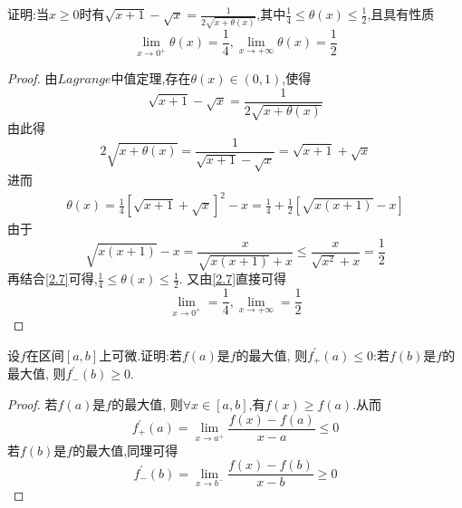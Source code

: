 \documentclass[lang=cn,newtx,10pt,scheme=chinese]{../Template/elegantbook}
\begin{document}
\begin{exercise}
证明:当\(x\geq0\)时有\(\sqrt{x+1}-\sqrt{x}=\frac{1}{2\sqrt{x+\theta(x)}}\),其中\(\frac{1}{4}\leq\theta(x)\leq\frac{1}{2}\),且具有性质
\begin{equation}
\lim\limits_{x\to0^{+}}\theta(x)=\frac{1}{4},\lim\limits_{x\to+\infty}\theta(x)=\frac{1}{2}
    \nonumber
\end{equation}

    \begin{proof}
    由$Lagrange$中值定理,存在$\theta(x)\in(0,1)$,使得
    \begin{equation}
    \sqrt{x+1}-\sqrt{x}=\frac{1}{2\sqrt{x+\theta(x)}}
        \nonumber
    \end{equation}
    由此得
    \begin{equation}
    2\sqrt{x+\theta(x)}=\frac{1}{\sqrt{x+1}-\sqrt{x}}=\sqrt{x+1}+\sqrt{x}
        \nonumber
    \end{equation}
    进而
    \begin{equation}\label{2.7}
    \begin{split}
    \theta(x)=\frac{1}{4}[\sqrt{x+1}+\sqrt{x}]^2-x
    =\frac{1}{4}+\frac{1}{2}[\sqrt{x(x+1)}-x]
    \end{split}
    \end{equation}
    由于
    \begin{equation}
    \sqrt{x(x+1)}-x=\frac{x}{\sqrt{x(x+1)}+x}\le \frac{x}{\sqrt{x^2}+x}=\frac{1}{2}
    \nonumber
    \end{equation}
    再结合\eqref{2.7}可得,$\frac{1}{4}\le\theta(x)\le\frac{1}{2}$.
    又由\eqref{2.7}直接可得
    \begin{equation}
    \lim_{x \to 0^{+}} =\frac{1}{4},\lim_{x \to +\infty}=\frac{1}{2}
        \nonumber
    \end{equation}
    \end{proof}
\end{exercise}

\begin{exercise}
    设\(f\)在区间\([a,b]\)上可微.证明:若\(f(a)\)是\(f\)的最大值,
    则\(f^{\prime}_{+}(a)\leq0\):若\(f(b)\)是\(f\)的最大值,
    则\(f^{\prime}_{-}(b)\geq0\).
    \begin{proof}
        若\(f(a)\)是\(f\)的最大值,
        则$\forall x\in[a,b]$,有$f(x) \ge f(a)$.从而
        \begin{equation}
            f_{+}^{\prime}(a)=\lim_{x\rightarrow a^+} \frac{f(x)-f(a)}{x-a}\leqslant 0
            \nonumber
        \end{equation}
        若\(f(b)\)是\(f\)的最大值,同理可得
        \begin{equation}
            f_{-}^{\prime}(b)=\lim_{x\rightarrow b^-} \frac{f(x)-f(b)}{x-b}\geqslant 0
            \nonumber
        \end{equation}
    \end{proof}
\end{exercise}
\end{document}
